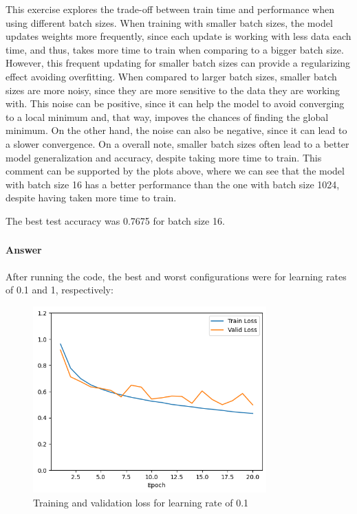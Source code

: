\documentclass{article}
\begin{document}
This exercise explores the trade-off between train time and performance when using different batch sizes. When training with smaller batch sizes, the model updates weights more frequently,
since each update is working with less data each time, and thus, takes more time to train when comparing to a bigger batch size. However, this frequent updating for smaller batch sizes can 
provide a regularizing effect avoiding overfitting. When compared to larger batch sizes, smaller batch sizes are more noisy, since they are more sensitive to the data they are working with. This noise can be positive, since it can help the model
to avoid converging to a local minimum and, that way, impoves the chances of finding the global minimum. On the other hand, the noise can also be negative, since it can lead to a slower convergence. On a overall note, smaller batch sizes often lead to a better 
model generalization and accuracy, despite taking more time to train. This comment can be supported by the plots above, where we can see that the model with batch size 16 has a better performance than the one with batch size 1024, despite having taken more time to train.

The best test accuracy was 0.7675 for batch size 16.

\subsubsection{}
\paragraph{Answer} After running the code, the best and worst configurations were for learning rates of 0.1 and 1, respectively:

\begin{figure}[H]
    \centering
    \includegraphics[width=0.8\textwidth]{"plots/mlp-training-loss-batch-16-lr-0.1-epochs-20-hidden-200-dropout-0.0-l2-0-layers-2-act-relu-opt-sgd.png"}
    \caption{Training and validation loss for learning rate of 0.1}
    \label{2.2b learning rate 0.1}
\end{figure}
\end{document}
